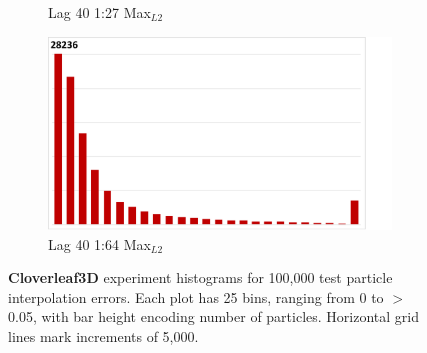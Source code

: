 \begin{figure}
\begin{subfigure}{0.195\textwidth}
\vspace{-2mm}
\caption{Lag 40 1:27 Max$_{L2}$}
\end{subfigure}
\begin{subfigure}{0.195\textwidth}
\centering
\includegraphics[width=0.9\linewidth, trim={0cm 0cm 2.5cm 0cm}, clip]{results/cloverleaf3d/lag_6/Lag6_Max.pdf}
\vspace{-2mm}
\caption{Lag 40 1:64 Max$_{L2}$}
\end{subfigure}
\vspace{-3mm}
\caption{\textbf{Cloverleaf3D} experiment histograms for 100,000 test particle interpolation errors. Each plot has 25 bins, ranging from 0 to $>$0.05, with bar height encoding number of particles. Horizontal grid lines mark increments of 5,000.} 
\label{fig:clover_histograms}
\vspace{-6mm}
\end{figure}

